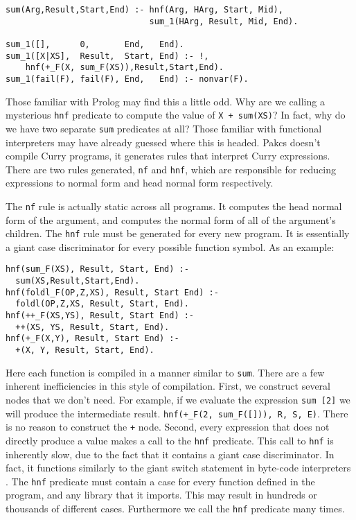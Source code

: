 \begin{verbatim}
sum(Arg,Result,Start,End) :- hnf(Arg, HArg, Start, Mid),
                             sum_1(HArg, Result, Mid, End).

sum_1([],      0,       End,   End).
sum_1([X|XS],  Result,  Start, End) :- !, 
    hnf(+_F(X, sum_F(XS)),Result,Start,End).
sum_1(fail(F), fail(F), End,   End) :- nonvar(F).
\end{verbatim}

Those familiar with Prolog may find this a little odd.
Why are we calling a mysterious \texttt{hnf} predicate to compute the value of \texttt{X + sum(XS)}?
In fact, why do we have two separate \texttt{sum} predicates at all?
Those familiar with functional interpreters may have already guessed where this is headed.
Pakcs doesn't compile Curry programs, it generates rules that interpret Curry expressions.
There are two rules generated, \texttt{nf} and \texttt{hnf}, which are responsible for reducing expressions
to normal form and head normal form respectively.

The \texttt{nf} rule is actually static across all programs.  It computes the head normal form of the argument,
and computes the normal form of all of the argument's children.
The \texttt{hnf} rule must be generated for every new program.
It is essentially a giant case discriminator for every possible function symbol.
As an example:

\begin{verbatim}
hnf(sum_F(XS), Result, Start, End) :- 
  sum(XS,Result,Start,End).
hnf(foldl_F(OP,Z,XS), Result, Start End) :- 
  foldl(OP,Z,XS, Result, Start, End).
hnf(++_F(XS,YS), Result, Start End) :- 
  ++(XS, YS, Result, Start, End).
hnf(+_F(X,Y), Result, Start End) :- 
  +(X, Y, Result, Start, End).
\end{verbatim}

Here each function is compiled in a manner similar to \texttt{sum}.
There are a few inherent inefficiencies in this style of compilation.
First, we construct several nodes that we don't need.
For example, if we evaluate the expression \texttt{sum [2]} we will produce the intermediate result.
\texttt{hnf(+\_F(2, sum\_F([])), R, S, E)}.
There is no reason to construct the \texttt + node.
Second, every expression that does not directly produce a value makes a call to the \texttt{hnf}
predicate.
This call to \texttt{hnf} is inherently slow, due to the fact that it contains a giant case discriminator.
In fact, it functions similarly to the giant switch statement in byte-code interpreters \cite{vmSwitch}.
The \texttt{hnf} predicate must contain a case for every function defined in the program, and any library that it imports.
This may result in hundreds or thousands of different cases.  Furthermore we call the \texttt{hnf} predicate many times.

